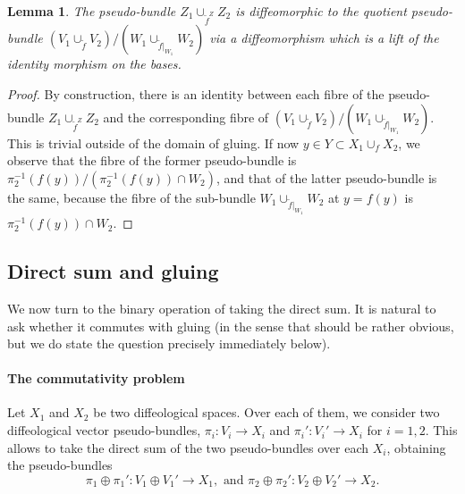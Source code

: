 \documentclass{article}
\newtheorem{lemma}{Lemma}[section]
\begin{document}
\begin{lemma}
The pseudo-bundle $Z_1\cup_{\tilde{f}^Z}Z_2$ is diffeomorphic to the quotient pseudo-bundle $(V_1\cup_{\tilde{f}}V_2)/(W_1\cup_{\tilde{f}|_{W_1}}W_2)$ via a diffeomorphism which is a lift of the 
identity morphism on the bases.
\end{lemma}

\begin{proof}
By construction, there is an identity between each fibre of the pseudo-bundle $Z_1\cup_{\tilde{f}^Z}Z_2$ and the corresponding fibre of $(V_1\cup_{\tilde{f}}V_2)/(W_1\cup_{\tilde{f}|_{W_1}}W_2)$. This
is trivial outside of the domain of gluing. If now $y\in Y\subset X_1\cup_f X_2$, we observe that the fibre of the former pseudo-bundle is $\pi_2^{-1}(f(y))/\left(\pi_2^{-1}(f(y))\cap W_2\right)$, and that of the 
latter pseudo-bundle is the same, because the fibre of the sub-bundle $W_1\cup_{\tilde{f}|_{W_1}}W_2$ at $y=f(y)$ is $\pi_2^{-1}(f(y))\cap W_2$.
\end{proof}


\subsection{Direct sum and gluing}

We now turn to the binary operation of taking the direct sum. It is natural to ask whether it commutes with gluing (in the sense that should be rather obvious, but we do state the question precisely
immediately below). 

\paragraph{The commutativity problem} Let $X_1$ and $X_2$ be two diffeological spaces. Over each of them, we consider two diffeological vector pseudo-bundles, $\pi_i:V_i\to X_i$ and $\pi_i':V_i'\to X_i$ 
for $i=1,2$. This allows to take the direct sum of the two pseudo-bundles over each $X_i$, obtaining the pseudo-bundles
$$\pi_1\oplus\pi_1':V_1\oplus V_1'\to X_1,\mbox{ and }\pi_2\oplus\pi_2':V_2\oplus V_2'\to X_2.$$
\end{document}
